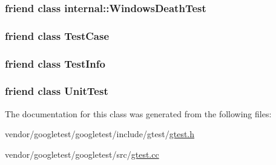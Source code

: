 \subsubsection[{\texorpdfstring{internal\+::\+Windows\+Death\+Test}{internal::WindowsDeathTest}}]{\setlength{\rightskip}{0pt plus 5cm}friend class internal\+::\+Windows\+Death\+Test\hspace{0.3cm}{\ttfamily [friend]}}\hypertarget{classtesting_1_1TestResult_a6aeedc04a0590fcc1b3c5f687dbb0f9f}{}\label{classtesting_1_1TestResult_a6aeedc04a0590fcc1b3c5f687dbb0f9f}
\subsubsection[{\texorpdfstring{Test\+Case}{TestCase}}]{\setlength{\rightskip}{0pt plus 5cm}friend class {\bf Test\+Case}\hspace{0.3cm}{\ttfamily [friend]}}\hypertarget{classtesting_1_1TestResult_aff779e55b06adfa7c0088bd10253f0f0}{}\label{classtesting_1_1TestResult_aff779e55b06adfa7c0088bd10253f0f0}
\subsubsection[{\texorpdfstring{Test\+Info}{TestInfo}}]{\setlength{\rightskip}{0pt plus 5cm}friend class {\bf Test\+Info}\hspace{0.3cm}{\ttfamily [friend]}}\hypertarget{classtesting_1_1TestResult_a4c49c2cdb6c328e6b709b4542f23de3c}{}\label{classtesting_1_1TestResult_a4c49c2cdb6c328e6b709b4542f23de3c}
\subsubsection[{\texorpdfstring{Unit\+Test}{UnitTest}}]{\setlength{\rightskip}{0pt plus 5cm}friend class {\bf Unit\+Test}\hspace{0.3cm}{\ttfamily [friend]}}\hypertarget{classtesting_1_1TestResult_a832b4d233efee1a32feb0f4190b30d39}{}\label{classtesting_1_1TestResult_a832b4d233efee1a32feb0f4190b30d39}


The documentation for this class was generated from the following files\+:\begin{DoxyCompactItemize}
\item 
vendor/googletest/googletest/include/gtest/\hyperlink{gtest_8h}{gtest.\+h}\item 
vendor/googletest/googletest/src/\hyperlink{gtest_8cc}{gtest.\+cc}\end{DoxyCompactItemize}
